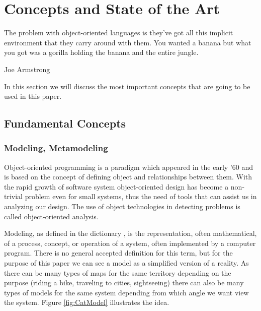 \chapter{Concepts and State of the Art}\label{ch:2}

\epigraph{The problem with object-oriented languages is they've got all this
implicit environment that they carry around with them. You wanted a banana but what you got was a gorilla holding the banana and the entire jungle.}{Joe Armstrong}

In this section we will discuss the most important concepts that are going to
be used in this paper.


\section{Fundamental Concepts}

\subsection{Modeling, Metamodeling}


	Object-oriented programming is a paradigm which appeared in the
early '60 \cite{wiki:oop} and is based on the concept of defining object and
relationships between them. With the rapid growth of software system
object-oriented design has become a non-trivial problem even for small systems,
thus the need of tools that can assist us in analyzing our design. The use of
object technologies in detecting problems is called object-oriented analysis.

	Modeling, as defined in the dictionary \cite{dictionary:modeling}, is the
representation, often mathematical, of a process, concept, or operation of a system, 
often implemented by a computer program.  There is no general accepted
definition for this term, but for the purpose of this paper we can see a model
as a simplified version of a reality. As there can be many types of maps for the
same territory depending on the purpose (riding a bike, traveling to cities,
sightseeing) there can also be many types of models for the same system depending from which angle
we want view the system. Figure \ref{fig:CatModel} illustrates the idea.

